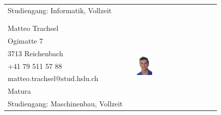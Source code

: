 \begin{tabular}{lp{3.3cm}l}
    Studiengang: Informatik, Vollzeit           & &  \\
                                                & &  \\
                                                & &  \\
    Matteo Trachsel                             & &  \multirow{8}{4cm}{\includegraphics[width=0.2\textwidth]{DasTeam/Bilder/MatteoTrachsel.jpg}} \\
    Ogimatte 7                                  & &  \\
    3713 Reichenbach                            & &  \\
    +41 79 511 57 88                            & &  \\
    matteo.trachsel@stud.hslu.ch                & &  \\
    Matura                                      & &  \\
    Studiengang: Maschinenbau, Vollzeit         & &  \\
\end{tabular}
    
